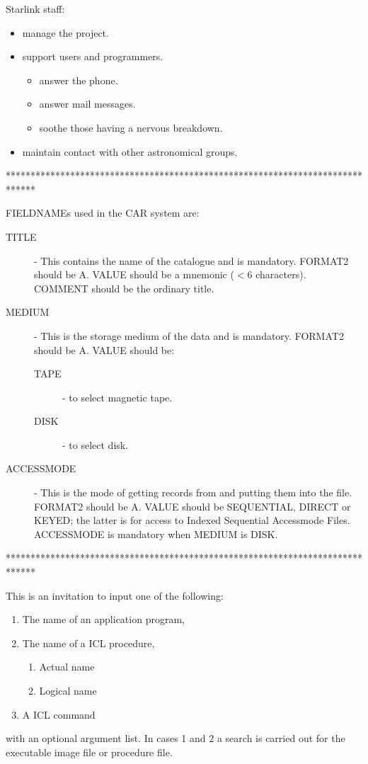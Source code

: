 \documentclass[twoside,11pt]{starlink}
\begin{document}
\footnotesize
\begin{terminalv}
Starlink staff:
\begin{itemize}
  \item manage the project.
  \item support users and programmers.
  \begin{itemize}
    \item answer the phone.
    \item answer mail messages.
    \item soothe those having a nervous breakdown.
  \end{itemize}
  \item maintain contact with other astronomical groups.
\end{itemize}

******************************************************************************

FIELDNAMEs used in the CAR system are:
\begin{description}
  \item [TITLE] -
  This contains the name of the catalogue and is mandatory.
  FORMAT2 should be A.
  VALUE should be a mnemonic ($<$6 characters).
  COMMENT should be the ordinary title.
  \item [MEDIUM] -
  This is the storage medium of the data and is mandatory.
  FORMAT2 should be A.
  VALUE should be:
  \begin{description}
    \item [TAPE] -
    to select magnetic tape.
    \item [DISK] -
    to select disk.
  \end{description}
  \item [ACCESSMODE] -
  This is the mode of getting records from and putting them into the file.
  FORMAT2 should be A.
  VALUE should be SEQUENTIAL, DIRECT or KEYED; the latter is for access to
  Indexed Sequential Accessmode Files.
  ACCESSMODE is mandatory when MEDIUM is DISK.
\end{description}

******************************************************************************

This is an invitation to input one of the following:
\begin{enumerate}
  \item The name of an application program,
  \item The name of a ICL procedure,
  \begin{enumerate}
    \item Actual name
    \item Logical name
  \end{enumerate}
  \item A ICL command
\end{enumerate}
with an optional argument list.
In cases 1 and 2 a search is carried out for the executable image file or
procedure file.
\end{terminalv}
\normalsize
\end{document}

